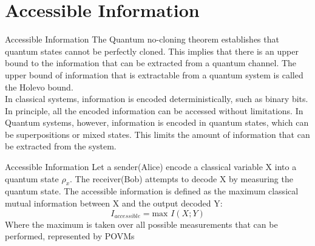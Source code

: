 \section{Accessible Information}

\begin{frame}{Accessible Information}
The Quantum no-cloning theorem establishes that quantum states cannot be perfectly cloned. This implies that there is an upper bound to the information that can be extracted from a quantum channel. The upper bound of information that is extractable from a quantum system is called the Holevo bound.\\
In classical systems, information is encoded deterministically, such as binary bits. In principle, all the encoded information can be accessed without limitations. In Quantum systems, however, information is encoded in quantum states, which can be superpositions or mixed states. This limits the amount of information that can be extracted from the system.
\end{frame}

\begin{frame}{Accessible Information}
Let a sender(Alice) encode a classical variable X into a quantum state $\rho_x$. The receiver(Bob) attempts to decode X by measuring the quantum state. The accessible information is defined as the maximum classical mutual information between X and the output decoded Y:
\[
I_{accessible} = \text{max } I(X;Y)
\]
Where the maximum is taken over all possible measurements that can  be performed, represented by POVMs
\end{frame}

